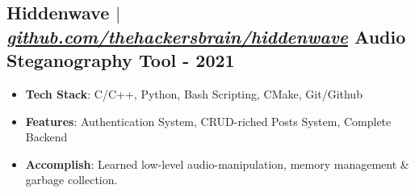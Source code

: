 \documentclass[11pt]{article} %
\begin{document}
\subsection{Hiddenwave $|$ \normalfont\textit{\href{https://github.com/thehackersbrain/hiddenwave}{github.com/thehackersbrain/hiddenwave}} \hfill Audio Steganography Tool - \textbf{2021}}
\vspace{3pt}
\begin{itemize}
  \item \textbf{Tech Stack}: C/C++, Python, Bash Scripting, CMake, Git/Github
  \item \textbf{Features}: Authentication System, CRUD-riched Posts System, Complete Backend
  \item \textbf{Accomplish}: Learned low-level audio-manipulation, memory management \& garbage collection.
\end{itemize}
\end{document}

